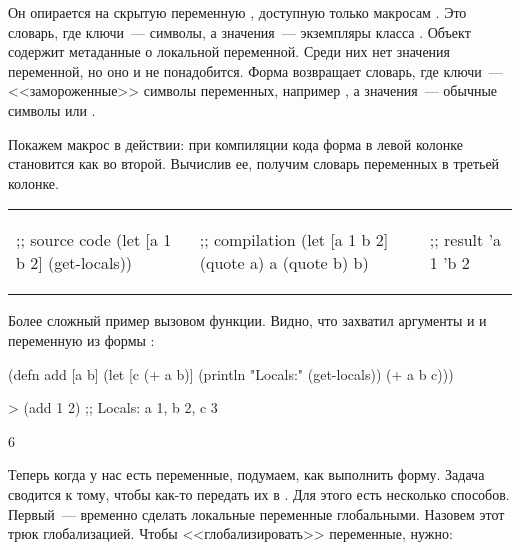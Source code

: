 Он опирается на скрытую переменную , доступную только макросам . Это словарь, где ключи~--- символы, а значения~--- экземпляры класса . Объект  содержит метаданные о локальной переменной. Среди них нет значения переменной, но оно и не понадобится. Форма  возвращает словарь, где ключи~--- <<замороженные>> символы переменных, например , а значения~--- обычные символы  или .

Покажем макрос в действии: при компиляции кода форма в левой колонке становится как во второй. Вычислив ее, получим словарь переменных в третьей колонке.

\begin{english}
\noindent
\begin{tabular}{ @{}p{4cm} @{}p{4cm} @{}p{3cm} }

  \begin{clojure}
;; source code
(let [a 1
      b 2]
  (get-locals))
  \end{clojure}

&

  \begin{clojure}
;; compilation
(let [a 1
      b 2]
  {(quote a) a
   (quote b) b})
  \end{clojure}

&

  \begin{clojure}
;; result
{'a 1 'b 2}
  \end{clojure}

\end{tabular}
\end{english}

Более сложный пример вызовом функции. Видно, что  захватил аргументы  и  и переменную  из формы :

\begin{english}
  \begin{clojure}
(defn add
  [a b]
  (let [c (+ a b)]
    (println "Locals:" (get-locals))
    (+ a b c)))

> (add 1 2)
;; Locals: {a 1, b 2, c 3}

6
  \end{clojure}
\end{english}

Теперь когда у нас есть переменные, подумаем, как выполнить форму. Задача сводится к тому, чтобы как-то передать их в . Для этого есть несколько способов. Первый~--- временно сделать локальные переменные глобальными. Назовем этот трюк глобализацией. Чтобы <<глобализировать>> переменные, нужно:

